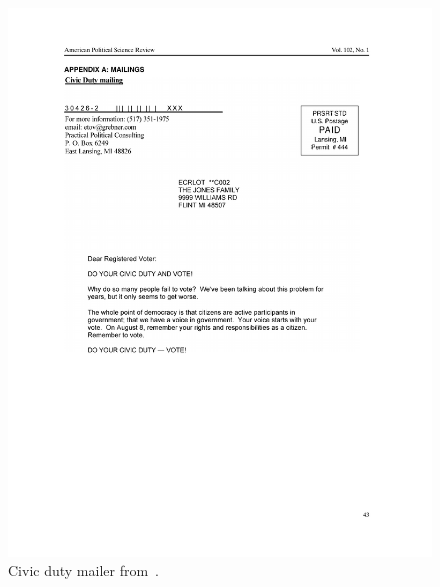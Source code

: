 \documentclass{article}
\begin{document}
\begin{figure}
\centering
\includegraphics[width=\textwidth]{figures/gerber_social_2008_civicduty}
\caption{Civic duty mailer from~\citet{gerber_social_2008}.}
\label{fig:gerber_social_2008_civicduty}
\end{figure}
\end{document}
